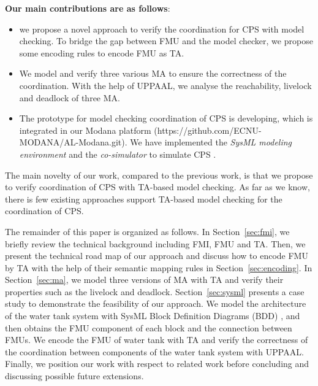 \textbf{Our main contributions are as follows}:
\begin{itemize}
\item
we propose a novel approach to verify the coordination for CPS with model checking. To bridge the gap between FMU and the model checker, we propose some encoding rules to encode FMU as TA.
\item
We model and verify three various MA to ensure the correctness of the coordination. With the help of UPPAAL, we analyse the reachability, livelock and deadlock of three MA.
\item
The prototype for model checking coordination of CPS is developing, which is integrated in our Modana platform \cite{Cheng2015Modana}(https://github.com/ECNU-MODANA/AL-Modana.git). We have implemented the \textit{SysML modeling environment} and the \textit{co-simulator} to simulate CPS \cite{Fritzson1998Modelica}.
\end{itemize}
The main novelty of our work, compared to the previous work, is that we propose to verify coordination of CPS with TA-based model checking. As far as we know, there is few existing approaches support TA-based model checking for the coordination of CPS.

The remainder of this paper is organized as follows. In Section~\ref{sec:fmi}, we briefly review the technical background including FMI, FMU and TA. Then, we present the technical road map of our approach and discuss how to encode FMU by TA with the help of their semantic mapping rules in Section~\ref{sec:encoding}. In Section~\ref{sec:ma}, we model three versions of MA with TA and verify their properties such as the livelock and deadlock. Section~\ref{sec:sysml} presents a case study to demonstrate the feasibility of our approach. We model the architecture of the water tank system with SysML Block Definition Diagrams (BDD) \cite{SemerathBHSV17}, and then obtains the FMU component of each block and the connection between FMUs. We encode the FMU of water tank with TA and verify the correctness of the coordination between components of the water tank system with UPPAAL. Finally, we position our work with respect to related work before concluding and discussing possible future extensions.




















